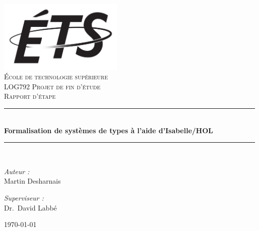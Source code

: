 \documentclass[a4paper, oneside, 12pt, titlepage]{article}
\newcommand{\HRule}{\rule{\linewidth}{0.5mm}}
\begin{document}

\begin{titlepage}
  \begin{center}
    \includegraphics[width=6cm]{./logo-ETS.png}~\\[1cm]

    \textsc{\LARGE École de technologie supérieure}\\[1.5cm]

    \textsc{\Large LOG792 Projet de fin d'étude}\\[0.25cm]
    \textsc{\Large Rapport d'étape}\\[0.5cm]

    \HRule \\[0.4cm]
    { \huge \bfseries Formalisation de systèmes de types à l'aide d'Isabelle/HOL \\[0.4cm] }

    \HRule \\[1.5cm]

    \begin{minipage}{0.4\textwidth}
    \begin{flushleft} \large
    \emph{Auteur :}\\
    Martin Desharnais
    \end{flushleft}
    \end{minipage}
    \begin{minipage}{0.4\textwidth}
    \begin{flushright} \large
    \emph{Superviseur :} \\
    Dr.~David Labbé
    \end{flushright}
    \end{minipage}

    \vfill

    {\large \today}

  \end{center}
\end{titlepage}
\end{document}

